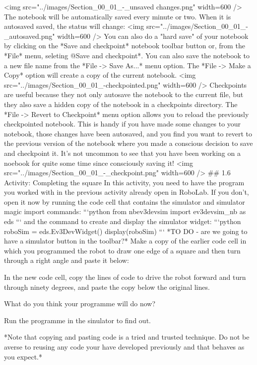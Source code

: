 \documentclass[letterpaper,10pt,english]{sphinxmanual}
\begin{document}
{<img src="../images/Section_00_01_-_unsaved changes.png" width=600 />
The notebook will be automatically saved every minute or two. When it is autosaved saved, the status will change:
<img src="../images/Section_00_01_-_autosaved.png" width=600 />
You can also do a "hard save" of your notebook by clicking on the *Save and checkpoint* notebook toolbar button or, from the *File* menu, seleting @Save and checkpoint*. You can also save the notebook to a new file name from the *File -> Save As...* menu option. The *File -> Make a Copy* option will create a copy of the current notebook.
<img src="../images/Section_00_01_-checkpointed.png" width=600 />
Checkpoints are useful because they not only autosave the notebook to the current file, but they also save a hidden copy of the notebook in a checkpoints directory. The *File -> Revert to Checkpoint* menu option allows you to reload the previously checkpointed notebook. This is handy if you have made some changes to your notebook, those changes have been autosaved, and you find you want to revert to the previous version of the notebook where you made a conscious decision to save and checkpoint it.
It's not uncommon to see that you have been working on a noebook for quite some time since consciously saving it!
<img src="../images/Section_00_01_-_checkpoint.png" width=600 />
## 1.6 Activity: Completing the square
In this activity, you need to have the program you worked with in the previous activity already open in RoboLab. If you don’t, open it now by running the code cell that contains the simulator and simulator magic import commands:
```python
from nbev3devsim import ev3devsim_nb as eds
```
and the command to create and display the simulator widget:
```python
roboSim = eds.Ev3DevWidget()
display(roboSim)
```
*TO DO - are we going to have a simulator button in the toolbar?*
Make a copy of the earlier code cell in which you programmed the robot to draw one edge of a square and then turn through a right angle and paste it below:

In the new code cell, copy the lines of code to drive the robot forward and turn through ninety degrees, and paste the copy below the original lines.

What do you think your programme will do now?

Run the programme in the sinulator to find out.

*Note that copying and pasting code is a tried and trusted technique. Do not be averse to reusing any code your have developed previously and that behaves as you expect.*


}
\end{document}
